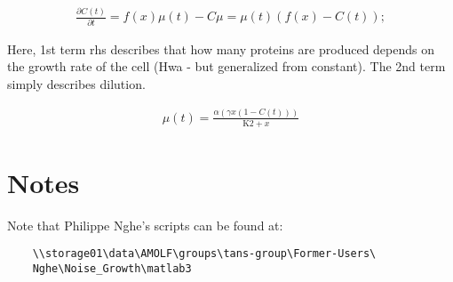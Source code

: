 \begin{align}
\frac{\partial C(t)}{\partial t}=f(x) \mu (t)-C \mu =\mu (t) \left(f(x)-C(t)\right);
\end{align}

Here, 1st term rhs describes that how many proteins are produced depends on the growth rate of the cell (Hwa - but generalized from constant). The 2nd term simply describes dilution.

\begin{align}
\mu (t)=\frac{\alpha  \left(\gamma  x \left(1-C(t)\right)\right)}{\text{K2}+x}
\end{align}

\section{Notes}

Note that Philippe Nghe's scripts can be found at:

\begin{verbatim}
    \\storage01\data\AMOLF\groups\tans-group\Former-Users\
    Nghe\Noise_Growth\matlab3
\end{verbatim}


%


